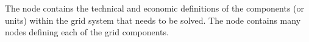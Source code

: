 The  node contains the technical and economic definitions of the components (or
units) within the grid system that needs to be solved. The  node contains many
 nodes defining each of the grid components.
